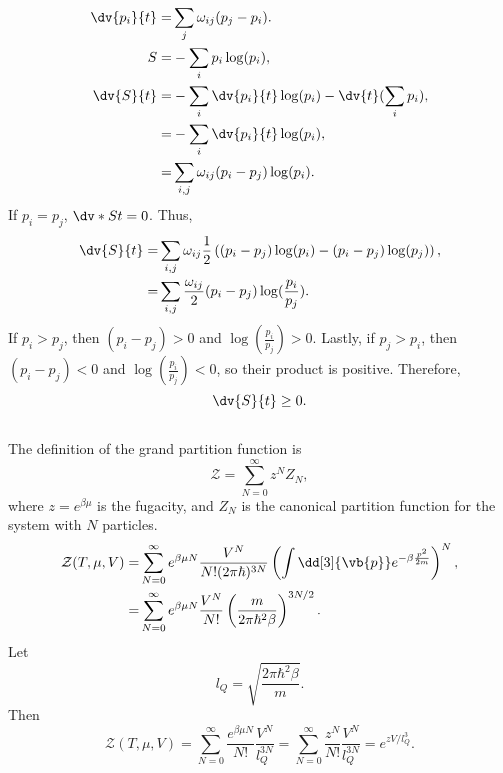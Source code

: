 \documentclass[a4paper,12pt,twoside]{article}
\begin{document}
\begin{multicols*}{2}
\subsection{}%
\begin{align}
	\dv{p_i}{t} =& \sum_{j} \omega_{ij}(p_j-p_i).\\
	S =& -\sum_{i} p_i\log(p_i),\\
	\dv{S}{t} =& -\sum_{i}\dv{p_i}{t}\log(p_i) - \dv{t}(\sum_{i}p_i),\\
	=& -\sum_{i}\dv{p_i}{t}\log(p_i),\\
	=& \sum_{i,j} \omega_{ij}(p_i-p_j)\log(p_i).
\end{align}
If $p_i = p_j$, $\dv*{S}{t} = 0$.
Thus,
\begin{align}
	\dv{S}{t} =& \sum_{i,j} \omega_{ij}\frac{1}{2}\left((p_i-p_j)\log(p_i)-(p_i-p_j)\log(p_j)\right),\\
	=& \sum_{i,j} \frac{\omega_{ij}}{2}(p_i-p_j)\log(\frac{p_i}{p_j}).
\end{align}
If $p_i > p_j$, then $(p_i-p_j) > 0$ and $\log(\frac{p_i}{p_j}) > 0$.
Lastly, if $p_j > p_i$, then $(p_i-p_j) < 0$ and $\log(\frac{p_i}{p_j}) < 0$, so their product is positive.
Therefore,
\begin{equation}
	\dv{S}{t} \geq 0.
\end{equation}
\subsection{}%
\subsubsection{}
The definition of the grand partition function is
\begin{equation}
	\mathcal{Z} = \sum_{N=0}^\infty z^N Z_N,
	\label{eq: gce}
\end{equation}
where $z = e^{\beta\mu}$ is the fugacity, and $Z_N$ is the canonical partition function for the system with $N$ particles.
\begin{align}
\mathcal{Z}(T,\mu,V)
=& \sum_{N=0}^\infty e^{\beta \mu N} \frac{V^N}{N!(2\pi \hbar)^{3N}} \left(\int \dd[3]{\vb{p}} e^{-\beta \frac{p^2}{2m}}\right)^N,\\
=& \sum_{N=0}^\infty e^{\beta \mu N} \frac{V^N}{N!} \left(\frac{m}{2\pi \hbar^2 \beta}\right)^{3N/2}.
\end{align}
Let
\begin{equation}
	l_Q = \sqrt{\frac{2\pi \hbar^2 \beta}{m}}.
\end{equation}
Then
\begin{equation}
	\mathcal{Z}(T,\mu,V) = \sum_{N=0}^\infty  \frac{e^{\beta \mu N}}{N!} \frac{V^N}{l_Q^{3N}} = \sum_{N=0}^\infty  \frac{z^N}{N!} \frac{V^N}{l_Q^{3N}} = e^{z V / l_Q^3}.
	\label{eq: p3_gpf}
\end{equation}

\end{multicols*}
\end{document}
